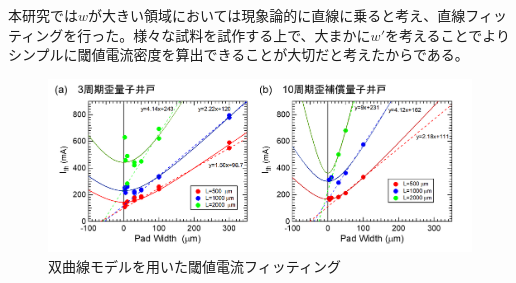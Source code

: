 本研究では$w$が大きい領域においては現象論的に直線に乗ると考え、直線フィッティングを行った。様々な試料を試作する上で、大まかに$w'$を考えることでよりシンプルに閾値電流密度を算出できることが大切だと考えたからである。


\begin{figure}[h]
	\centering
	\includegraphics[width=15cm]{figure/fig_3_1_w_prime.png}
	\caption{双曲線モデルを用いた閾値電流フィッティング}
	\label{fig:fig_3_1_w_prime}
\end{figure}


